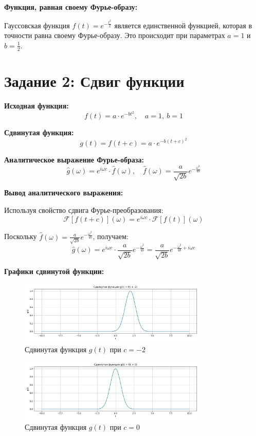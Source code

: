 \textbf{Функция, равная своему Фурье-образу:}

Гауссовская функция $f(t) = e^{-\frac{t^2}{2}}$ является единственной функцией, которая в точности равна своему Фурье-образу. Это происходит при параметрах $a = 1$ и $b = \frac{1}{2}$.

\section*{Задание 2: Сдвиг функции}

\textbf{Исходная функция:}
\[
f(t) = a \cdot e^{-b t^2}, \quad a = 1, \ b = 1
\]

\textbf{Сдвинутая функция:}
\[
g(t) = f(t + c) = a \cdot e^{-b (t + c)^2}
\]

\textbf{Аналитическое выражение Фурье-образа:}
\[
\hat{g}(\omega) = e^{i \omega c} \cdot \hat{f}(\omega), \quad \hat{f}(\omega) = \frac{a}{\sqrt{2b}} e^{-\frac{\omega^2}{4b}}
\]

\textbf{Вывод аналитического выражения:}

Используя свойство сдвига Фурье-преобразования:
\[
\mathcal{F}[f(t + c)](\omega) = e^{i \omega c} \cdot \mathcal{F}[f(t)](\omega)
\]

Поскольку $\hat{f}(\omega) = \frac{a}{\sqrt{2b}} e^{-\frac{\omega^2}{4b}}$, получаем:
\[
\hat{g}(\omega) = e^{i \omega c} \cdot \frac{a}{\sqrt{2b}} e^{-\frac{\omega^2}{4b}} = \frac{a}{\sqrt{2b}} e^{-\frac{\omega^2}{4b} + i \omega c}
\]

\textbf{Графики сдвинутой функции:}

\begin{figure}[H]
    \centering
    \includegraphics[width=0.8\textwidth]{g_function_c-2.png}
    \caption{Сдвинутая функция $g(t)$ при $c = -2$}
\end{figure}

\begin{figure}[H]
    \centering
    \includegraphics[width=0.8\textwidth]{g_function_c0.png}
    \caption{Сдвинутая функция $g(t)$ при $c = 0$}
\end{figure}

